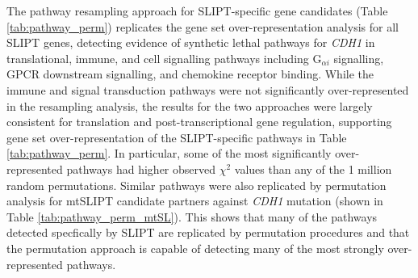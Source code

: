 The pathway resampling approach for SLIPT-specific gene candidates (Table \ref{tab:pathway_perm}) replicates the gene set over-represent\-ation analysis for all SLIPT genes, detecting evidence of synthetic lethal pathways for \textit{CDH1} in translational, immune, and cell signalling pathways including  G$_{\alpha i}$ signalling, GPCR downstream signalling, and chemokine receptor binding. While the immune and signal transduction pathways were not significantly over-represented in the resampling analysis, the results for the two approaches were largely consistent for translation and post-transcriptional gene regulation, supporting gene set over-represent\-ation of the SLIPT-specific pathways in Table \ref{tab:pathway_perm}. In particular, some of the most significantly over-represented pathways had higher observed $\chi^2$ values than any of the 1 million random permutations. Similar pathways were also replicated by permutation analysis for mtSLIPT candidate partners against \textit{CDH1} mutation (shown in Table \ref{tab:pathway_perm_mtSL}). This shows that many of the pathways detected specfically by SLIPT are replicated by permutation procedures and that the permutation approach is capable of detecting many of the most strongly over-represented pathways. 


